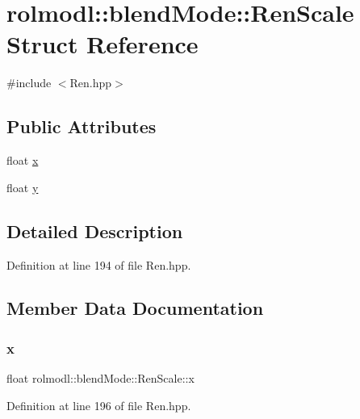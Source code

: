 \hypertarget{structrolmodl_1_1blend_mode_1_1_ren_scale}{}\section{rolmodl\+::blend\+Mode\+::Ren\+Scale Struct Reference}
\label{structrolmodl_1_1blend_mode_1_1_ren_scale}


{\ttfamily \#include $<$Ren.\+hpp$>$}

\subsection*{Public Attributes}
\begin{DoxyCompactItemize}
\item 
float \mbox{\hyperlink{structrolmodl_1_1blend_mode_1_1_ren_scale_aedce5da14747f6a7f7404753b03e1038}{x}}
\item 
float \mbox{\hyperlink{structrolmodl_1_1blend_mode_1_1_ren_scale_a314c29eb044213b1319cdee2ce0a10d0}{y}}
\end{DoxyCompactItemize}


\subsection{Detailed Description}


Definition at line 194 of file Ren.\+hpp.



\subsection{Member Data Documentation}
\mbox{\label{structrolmodl_1_1blend_mode_1_1_ren_scale_aedce5da14747f6a7f7404753b03e1038}} 
\subsubsection{\texorpdfstring{x}{x}}
{\footnotesize\ttfamily float rolmodl\+::blend\+Mode\+::\+Ren\+Scale\+::x}



Definition at line 196 of file Ren.\+hpp.

\mbox{\label{structrolmodl_1_1blend_mode_1_1_ren_scale_a314c29eb044213b1319cdee2ce0a10d0}} 

